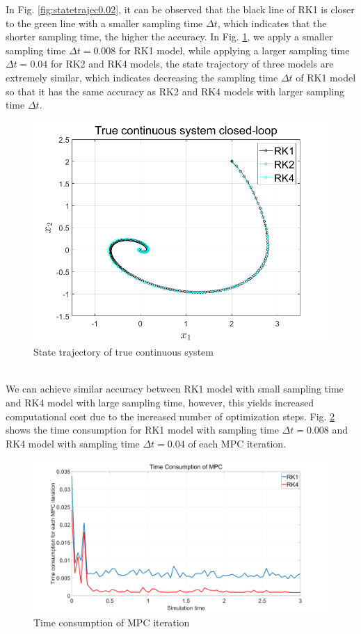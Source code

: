 In Fig. \ref{fig:statetrajec0.02}, it can be observed that the black line of RK1 is closer to the green line with a smaller sampling time $\Delta t$, which indicates that the shorter sampling time, the higher the accuracy.
\newline
In Fig. \ref{fig:statetrajec0.020.04}, we apply a smaller sampling time $\Delta t = 0.008$ for RK1 model, while applying a larger sampling time $\Delta t = 0.04$ for RK2 and RK4 models, the state trajectory of three models are extremely similar, which indicates decreasing the sampling time $\Delta t$ of RK1 model so that it has the same accuracy as RK2 and RK4 models with larger sampling time $\Delta t$.
 \begin{figure}[h!]
	\centering
	\includegraphics[width=\linewidth]{pics/delta0.04rk10.02rk2rk4.png}
	\caption{State trajectory of true continuous system}
	\label{fig:statetrajec0.020.04}
\end{figure}
\newline
\\
We can achieve similar accuracy between RK1 model with small sampling time and RK4 model with large sampling time, however, this yields increased computational cost due to the increased number of optimization steps. Fig. \ref{fig:timempc} shows the time consumption for RK1 model with sampling time $\Delta t = 0.008$ and RK4 model with sampling time $\Delta t =0.04$ of each MPC iteration.
\begin{figure}[H]
	\centering
	\includegraphics[width=\linewidth]{pics/timempc.png}
	\caption{Time consumption of MPC iteration}
	\label{fig:timempc}
\end{figure}
